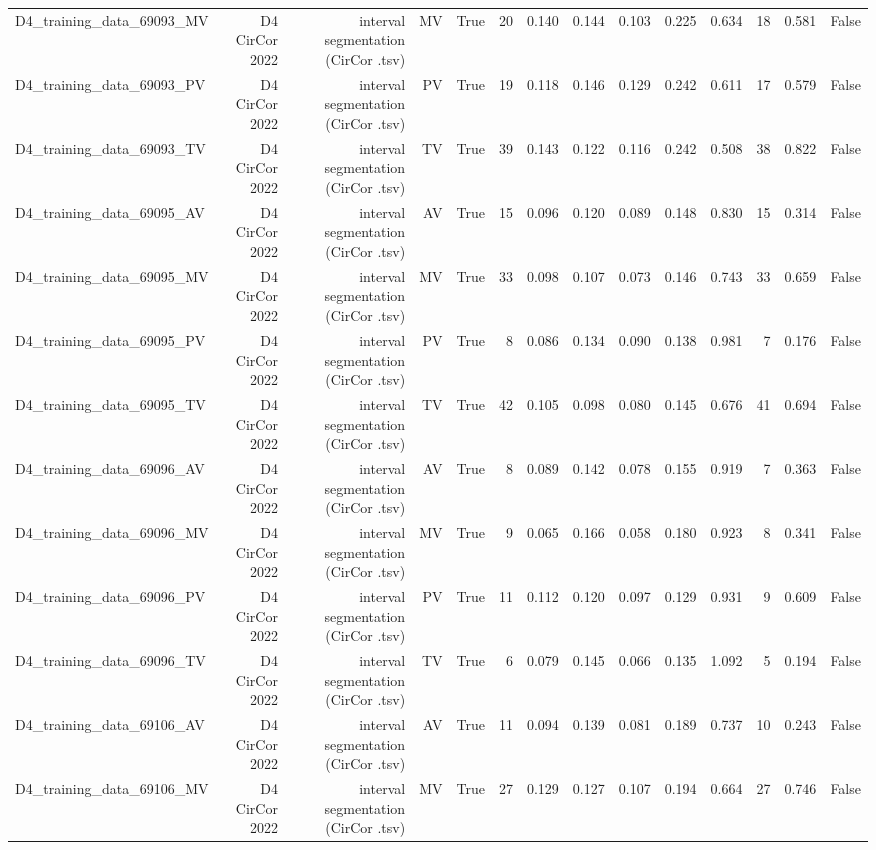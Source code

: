 \begin{table}[htbp]
\begin{tabular}{lrrrrrrrrrrrrr}
    D4\_training\_data\_69093\_MV & D4 CirCor 2022 & interval segmentation (CirCor .tsv) & MV & True & 20 & 0.140 & 0.144 & 0.103 & 0.225 & 0.634 & 18 & 0.581 & False \\
    D4\_training\_data\_69093\_PV & D4 CirCor 2022 & interval segmentation (CirCor .tsv) & PV & True & 19 & 0.118 & 0.146 & 0.129 & 0.242 & 0.611 & 17 & 0.579 & False \\
    D4\_training\_data\_69093\_TV & D4 CirCor 2022 & interval segmentation (CirCor .tsv) & TV & True & 39 & 0.143 & 0.122 & 0.116 & 0.242 & 0.508 & 38 & 0.822 & False \\
    D4\_training\_data\_69095\_AV & D4 CirCor 2022 & interval segmentation (CirCor .tsv) & AV & True & 15 & 0.096 & 0.120 & 0.089 & 0.148 & 0.830 & 15 & 0.314 & False \\
    D4\_training\_data\_69095\_MV & D4 CirCor 2022 & interval segmentation (CirCor .tsv) & MV & True & 33 & 0.098 & 0.107 & 0.073 & 0.146 & 0.743 & 33 & 0.659 & False \\
    D4\_training\_data\_69095\_PV & D4 CirCor 2022 & interval segmentation (CirCor .tsv) & PV & True & 8 & 0.086 & 0.134 & 0.090 & 0.138 & 0.981 & 7 & 0.176 & False \\
    D4\_training\_data\_69095\_TV & D4 CirCor 2022 & interval segmentation (CirCor .tsv) & TV & True & 42 & 0.105 & 0.098 & 0.080 & 0.145 & 0.676 & 41 & 0.694 & False \\
    D4\_training\_data\_69096\_AV & D4 CirCor 2022 & interval segmentation (CirCor .tsv) & AV & True & 8 & 0.089 & 0.142 & 0.078 & 0.155 & 0.919 & 7 & 0.363 & False \\
    D4\_training\_data\_69096\_MV & D4 CirCor 2022 & interval segmentation (CirCor .tsv) & MV & True & 9 & 0.065 & 0.166 & 0.058 & 0.180 & 0.923 & 8 & 0.341 & False \\
    D4\_training\_data\_69096\_PV & D4 CirCor 2022 & interval segmentation (CirCor .tsv) & PV & True & 11 & 0.112 & 0.120 & 0.097 & 0.129 & 0.931 & 9 & 0.609 & False \\
    D4\_training\_data\_69096\_TV & D4 CirCor 2022 & interval segmentation (CirCor .tsv) & TV & True & 6 & 0.079 & 0.145 & 0.066 & 0.135 & 1.092 & 5 & 0.194 & False \\
    D4\_training\_data\_69106\_AV & D4 CirCor 2022 & interval segmentation (CirCor .tsv) & AV & True & 11 & 0.094 & 0.139 & 0.081 & 0.189 & 0.737 & 10 & 0.243 & False \\
    D4\_training\_data\_69106\_MV & D4 CirCor 2022 & interval segmentation (CirCor .tsv) & MV & True & 27 & 0.129 & 0.127 & 0.107 & 0.194 & 0.664 & 27 & 0.746 & False \\

\end{tabular}
\end{table}
